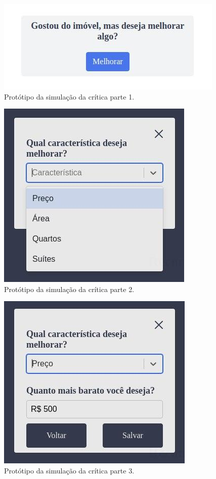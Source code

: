 \begin{apendicesenv}
\begin{figure}[H]
    \centering
    \includegraphics[scale=0.9]{figuras/consideracoes_finais/prototipo_simulacao_critica1.jpg}
    \caption[Protótipo da simulação da crítica parte 1]{Protótipo da simulação da crítica parte 1.}
    \label{fig:prototipo_simulacao_critica1}
\end{figure}

\begin{figure}[H]
    \centering
    \includegraphics[scale=0.7]{figuras/consideracoes_finais/prototipo_simulacao_critica2.jpg}
    \caption[Protótipo da simulação da crítica parte 2]{Protótipo da simulação da crítica parte 2.}
    \label{fig:prototipo_simulacao_critica2}
\end{figure}

\begin{figure}[H]
    \centering
    \includegraphics[scale=0.7]{figuras/consideracoes_finais/prototipo_simulacao_critica3.jpg}
    \caption[Protótipo da simulação da crítica parte 3]{Protótipo da simulação da crítica parte 3.}
    \label{fig:prototipo_simulacao_critica3}
\end{figure}


\end{apendicesenv}

